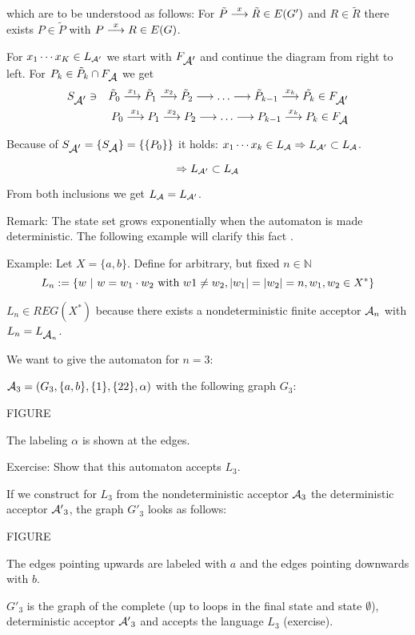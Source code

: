 which are to be understood as follows: For $\tilde{P} \stackrel{x}{\longrightarrow} \tilde{R} \in
E(G')$ and $R \in \tilde{R}$ there exists $P \in \tilde{P}$ with $P \stackrel{x}{\longrightarrow} R
\in E(G)$.

For $x_1 \cdots x_K \in \mbox{$L_{\mathcal{A'}}$}$ we start with $F_{\mbox{$\mathcal{A'}$}}$ and continue
the diagram from right to left. For $P_k \in \tilde{P}_k \cap F_{\mbox{$\mathcal{A}$}}$ we get
\begin{eqnarray*}
 & S_{\mbox{$\mathcal{A'}$}} \ni & \tilde{P}_0 \stackrel{x_1}{\longrightarrow} \tilde{P}_1 \stackrel{x_2}{\longrightarrow} \tilde{P}_2 \stackrel{}{\longrightarrow} \ldots
 \stackrel{}{\longrightarrow} \tilde{P}_{k-1} \stackrel{x_k}{\longrightarrow} \tilde{P_k} \in F_{\mbox{$\mathcal{A'}$}} \\
 & & P_0 \stackrel{x_1}{\longrightarrow} P_1 \stackrel{x_2}{\longrightarrow} P_2 \stackrel{}{\longrightarrow} \ldots \stackrel{}{\longrightarrow}
 P_{k-1} \stackrel{x_k}{\longrightarrow} P_k \in F_{\mbox{$\mathcal{A}$}} 
\end{eqnarray*}

Because of $S_{\mbox{$\mathcal{A'}$}} = \{ S_{\mbox{$\mathcal{A}$}} \} = \{\{ P_0 \}\}$ it holds: $x_1
\cdots x_k \in \mbox{$L_{\mathcal{A}}$} \Rightarrow \mbox{$L_{\mathcal{A'}}$} \subset \mbox{$L_{\mathcal{A}}$}$.

\[ \Rightarrow \mbox{$L_{\mathcal{A'}}$} \subset \mbox{$L_{\mathcal{A}}$}\]

From both inclusions we get $\mbox{$L_{\mathcal{A}}$} = \mbox{$L_{\mathcal{A'}}$}$.

Remark: The state set grows exponentially when the automaton is made
deterministic. The following example will clarify this fact \cite{Co}.

Example: Let $X = \{ a, b \}$. Define for arbitrary, but fixed $n \in
\mathbb{N}$ \[ L_n := \{ w \ |\  w = w_1 \cdot w_2 \mbox{ with } w1 \neq w_2, |w_1| = |w_2|
= n, w_1, w_2 \in X^* \} \]

$L_n \in REG(X^*)$ because there exists a nondeterministic finite acceptor
$\mbox{$\mathcal{A}$}_{n}$ with $L_n = L_{\mbox{$\mathcal{A}$}_{n}}$.

We want to give the automaton for $n = 3$:

$\mbox{$\mathcal{A}$}_3 = (G_3, \{a,b\}, \{1\}, \{22\}, \alpha)$ with the following graph
$G_3$:

FIGURE

The labeling $\alpha$ is shown at the edges.

Exercise: Show that this automaton accepts $L_3$.

If we construct for $L_3$ from the nondeterministic acceptor $\mbox{$\mathcal{A}$}_3$
the deterministic acceptor $\mbox{$\mathcal{A'}$}_3$, the graph $G'_3$ looks as follows:

FIGURE

The edges pointing upwards are labeled with $a$ and the edges pointing downwards
with $b$.

$G'_3$ is the graph of the complete (up to loops in the final state and state
$\emptyset$), deterministic acceptor $\mbox{$\mathcal{A'}$}_3$ and accepts the language $L_3$
(exercise).

